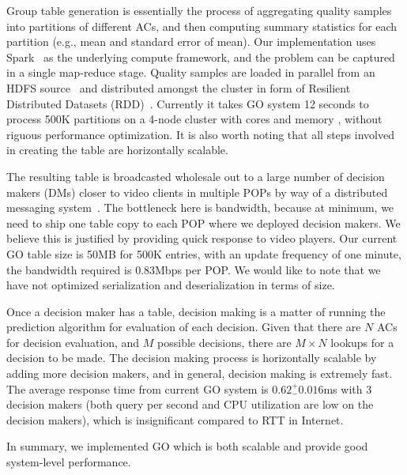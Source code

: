  Group table generation is essentially the process of aggregating quality samples into partitions of different ACs, and then computing summary statistics for each partition (e.g., mean and standard error of mean).
Our implementation uses Spark~\cite{spark} as the underlying compute framework, and the problem can be captured in a single map-reduce stage. 
Quality samples are loaded in parallel from an HDFS source~\cite{hadoop} and distributed amongst the cluster in form of Resilient Distributed Datasets (RDD)~\cite{zaharia2012resilient}. 
Currently it takes GO system 12 seconds to process 500K partitions on a 4-node cluster with \fillme cores and \fillme memory , without riguous performance optimization.
It is also worth noting that all steps involved in creating the table are horizontally scalable.


 The resulting table is broadcasted wholesale out to a large number of decision makers (DMs) closer to video clients in multiple POPs by way of a distributed messaging system~\cite{kreps2011kafka}. The bottleneck here is bandwidth, because at minimum, we need to ship one table copy to each POP where we deployed decision makers. We believe this is justified by providing quick response to video players. Our current GO table size is 50MB for 500K entries, with an update frequency of one minute, the bandwidth required is 0.83Mbps per POP. We would like to note that we have not optimized serialization and deserialization in terms of size.

 Once a decision maker has a table, decision making is a matter of running the prediction algorithm for evaluation of each decision. Given that there are $N$ ACs for decision evaluation, and $M$ possible decisions, there are $M \times N$ lookups for a decision to be made. The decision making process is horizontally scalable by adding more decision makers, and in general, decision making is extremely fast. The average response time from current GO system is $0.62 ^{+}_{-} 0.016$ms with 3 decision makers (both query per second and CPU utilization are low on the decision makers), which is insignificant compared to RTT in Internet.

In summary, we implemented GO which is both scalable and provide good system-level performance.


